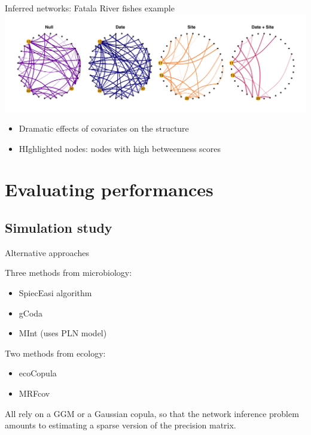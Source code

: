 \documentclass[11pt]{beamer}
\newcommand{\emphase}[1]{\textcolor{Complement}{#1}}
\begin{document}
\begin{frame}{Inferred networks: Fatala River fishes example}
\includegraphics[width=\linewidth]{BaransNets.png}
\begin{itemize}
\item Dramatic effects of covariates on the structure
\item HIghlighted nodes: nodes with high betweenness scores
\end{itemize}
\end{frame}
\section{Evaluating performances}

\subsection{Simulation study}

\begin{frame}{Alternative approaches}

 Three  methods from microbiology:
    \begin{itemize}
        \item \emphase{SpiecEasi} algorithm \citep{kurtz} 
        \item \emphase{gCoda} \citep{gcoda} 
        \item \emphase{MInt} \citep{MInt} (uses PLN model)
    \end{itemize}\bigskip
    
  Two  methods from ecology:
  \begin{itemize}
  \item \emphase{ecoCopula}\citep{PWT19}
  \item \emphase{MRFcov}\citep{CWL18}
  \end{itemize}
  \bigskip
All rely on a GGM or a Gaussian copula, so that the network inference problem amounts to estimating a sparse version of the precision matrix.
\end{frame}
\end{document}
